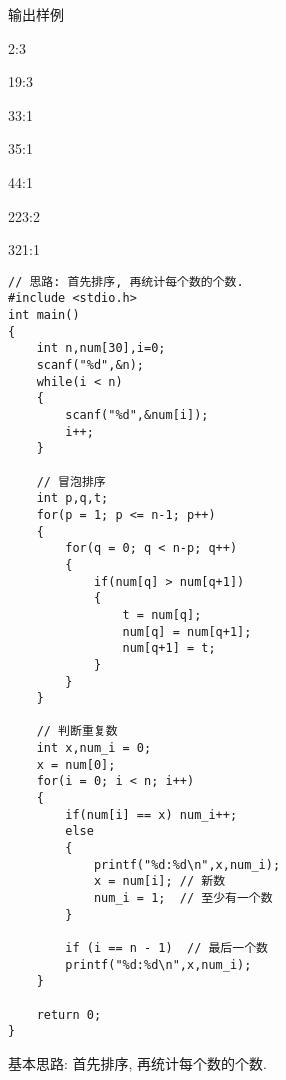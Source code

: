 输出样例

2:3

19:3

33:1

35:1

44:1

223:2

321:1

\begin{lstlisting}
// 思路: 首先排序, 再统计每个数的个数.
#include <stdio.h>
int main()
{
	int n,num[30],i=0;
	scanf("%d",&n);
	while(i < n) 
	{ 
		scanf("%d",&num[i]);
		i++; 
	} 
	
	// 冒泡排序
	int p,q,t;
	for(p = 1; p <= n-1; p++)
	{
		for(q = 0; q < n-p; q++)
		{
			if(num[q] > num[q+1])
			{
				t = num[q];
				num[q] = num[q+1];
				num[q+1] = t;
			}
		}
	} 
	
	// 判断重复数
	int x,num_i = 0;
	x = num[0]; 
	for(i = 0; i < n; i++)
	{
		if(num[i] == x) num_i++;
		else 
		{
			printf("%d:%d\n",x,num_i);
			x = num[i]; // 新数 
			num_i = 1;  // 至少有一个数  
		}	
		
		if (i == n - 1)  // 最后一个数 
		printf("%d:%d\n",x,num_i);
	} 
	
	return 0;
} 
\end{lstlisting}

\begin{note}[要点]
	基本思路: 首先排序, 再统计每个数的个数.
\end{note}

